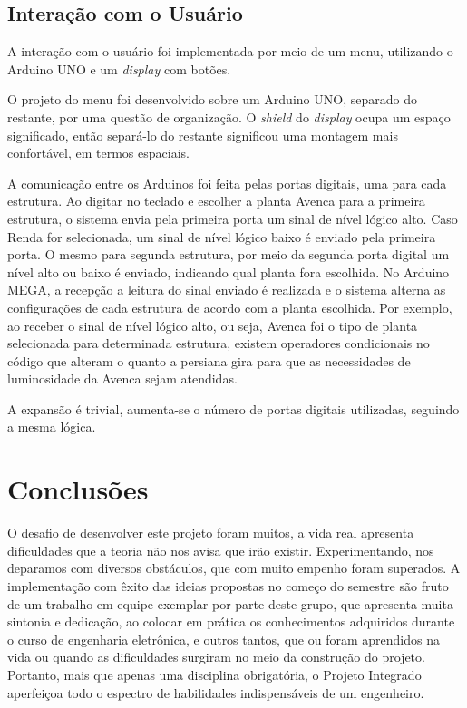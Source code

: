 \documentclass[a4paper,12pt]{report}
\begin{document}
	\cleardoublepage
	\section{Interação com o Usuário}
	\label{sec:comunicaoArduinos}
	A interação com o usuário foi implementada por meio de um menu, utilizando o Arduino UNO e um \textit{display} com botões.
	
	O projeto do menu foi desenvolvido sobre um Arduino UNO, separado do restante, por uma questão de organização. O \textit{shield} do \textit{display} ocupa um espaço significado, então separá-lo do restante significou uma montagem mais confortável, em termos espaciais. 
	
	A comunicação entre os Arduinos foi feita pelas portas digitais, uma para cada estrutura. Ao digitar no teclado e escolher a planta Avenca para a primeira estrutura, o sistema envia pela primeira porta um sinal de nível lógico alto. Caso Renda for selecionada, um sinal de nível lógico baixo é enviado pela primeira porta. O mesmo para segunda estrutura, por meio da segunda porta digital um nível alto ou baixo é enviado, indicando qual planta fora escolhida. 
	No Arduino MEGA, a recepção a leitura do sinal enviado é realizada e o sistema alterna as configurações de cada estrutura de acordo com a planta escolhida. Por exemplo, ao receber o sinal de nível lógico alto, ou seja, Avenca foi o tipo de planta selecionada para determinada estrutura, existem operadores condicionais no código que alteram o quanto a persiana gira para que as necessidades de luminosidade da Avenca sejam atendidas. 
	
	A expansão é trivial, aumenta-se o número de portas digitais utilizadas, seguindo a mesma lógica.

\cleardoublepage
\chapter{Conclusões}
	\label{cap:Conclusoes}
 	O desafio de desenvolver este projeto foram muitos, a vida real apresenta dificuldades que a teoria não nos avisa que irão existir. Experimentando, nos deparamos com diversos obstáculos, que com muito empenho foram superados. A implementação com êxito das ideias propostas no começo do semestre são fruto de um trabalho em equipe exemplar por parte deste grupo, que apresenta muita sintonia e dedicação, ao colocar em prática os conhecimentos adquiridos durante o curso de engenharia eletrônica, e outros tantos, que ou foram aprendidos na vida ou quando as dificuldades surgiram no meio da construção do projeto. Portanto, mais que apenas uma disciplina obrigatória, o Projeto Integrado aperfeiçoa todo o espectro de habilidades indispensáveis de um engenheiro. 
 
 
 
%
%	
	
	
	
	
	
	
	
	
	
	
	
		
	
	
	
\end{document}
